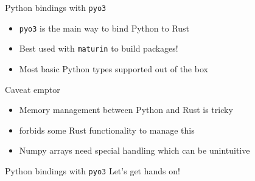 \documentclass{beamer}
\begin{document}
\begin{frame}{Python bindings with \texttt{pyo3}}
  \begin{itemize}
    \item \texttt{pyo3} is the main way to bind Python to Rust
    \item Best used with \texttt{maturin} to build packages!
    \item Most basic Python types supported out of the box
  \end{itemize}
\end{frame}

\begin{frame}{Caveat emptor}
  \begin{itemize}
    \item Memory management between Python and Rust is tricky
    \item {} forbids some Rust functionality to manage this
    \item Numpy arrays need special handling which can be unintuitive
  \end{itemize}
\end{frame}

\begin{frame}{Python bindings with \texttt{pyo3}}
  Let's get hands on!
\end{frame}
\end{document}
